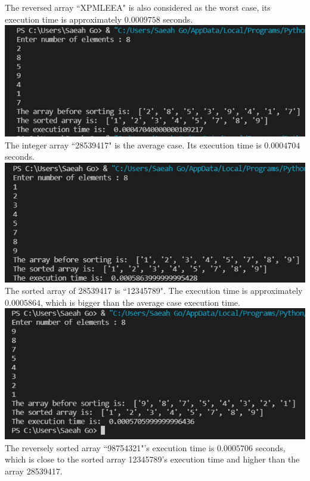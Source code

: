 \documentclass{article}
\begin{document}
The reversed array ``XPMLEEA" is also considered as the worst case, its execution time is approximately $0.0009758$ seconds. \\
\includegraphics[scale = 0.7]{28539417} \\
The integer array ``28539417" is the average case. Its execution time is $0.0004704$ seconds. \\
\includegraphics[scale = 0.7]{Ordered28539417} \\
The sorted array of 28539417 is ``12345789". The execution time is approximately $0.0005864$, which is bigger than the average case execution time. \\
\includegraphics[scale = 0.7]{Reversed 28539417} \\
The reversely sorted array ``98754321"'s execution time is $0.0005706$ seconds, which is close to the sorted array 12345789's execution time and higher than the array 28539417. \\
\end{document}
